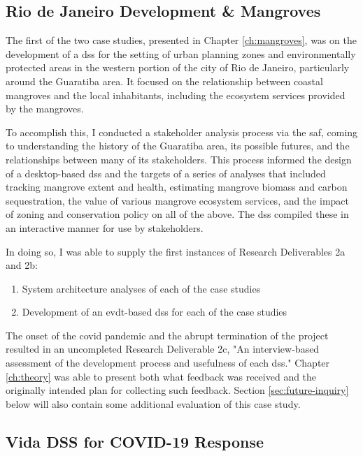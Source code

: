 \subsection{Rio de Janeiro Development \& Mangroves}

The first of the two case studies, presented in Chapter \ref{ch:mangroves}, was on the development of a \ac{dss} for the setting of urban planning zones and environmentally protected areas in the western portion of the city of Rio de Janeiro, particularly around the Guaratiba area. It focused on the relationship between coastal mangroves and the local inhabitants, including the ecosystem services provided by the mangroves.

To accomplish this, I conducted a stakeholder analysis process via the \ac{saf}, coming to understanding the history of the Guaratiba area, its possible futures, and the relationships between many of its stakeholders. This process informed the design of a desktop-based \ac{dss} and the targets of a series of analyses that included tracking mangrove extent and health, estimating mangrove biomass and carbon sequestration, the value of various mangrove ecosystem services, and the impact of zoning and conservation policy on all of the above. The \ac{dss} compiled these in an interactive manner for use by stakeholders.

In doing so, I was able to supply the first instances of Research Deliverables 2a and 2b:

\begin{enumerate}[label=\emph{\alph*},itemsep=0pt,parsep=0pt]
	\item{System architecture analyses of each of the case studies} 
	\item{Development of an \ac{evdt}-based \ac{dss} for each of the case studies} 
\end{enumerate}

The onset of the \ac{covid} pandemic and the abrupt termination of the project resulted in an uncompleted Research Deliverable 2c, "An interview-based assessment of the development process and usefulness of each \ac{dss}." Chapter \ref{ch:theory} was able to present both what feedback was received and the originally intended plan for collecting such feedback. Section \ref{sec:future-inquiry} below will also contain some additional evaluation of this case study.

\subsection{Vida DSS for COVID-19 Response}

